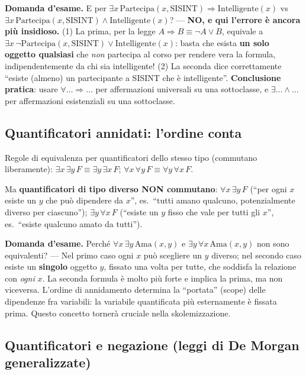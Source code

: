 \documentclass[11pt,a4paper]{report}
\newcommand{\domandaesame}[1]{\begin{esame}\textbf{Domanda d'esame.} #1\end{esame}}
\begin{document}
\domandaesame{E per $\exists x\, \text{Partecipa}(x,\text{SISINT}) \Rightarrow \text{Intelligente}(x)$ vs $\exists x\, \text{Partecipa}(x,\text{SISINT}) \wedge \text{Intelligente}(x)$? --- \textbf{NO, e qui l'errore è ancora più insidioso.} (1) La prima, per la legge $A\Rightarrow B \equiv \neg A\vee B$, equivale a $\exists x\, \neg\text{Partecipa}(x,\text{SISINT}) \vee \text{Intelligente}(x)$: basta che esista \textbf{un solo oggetto qualsiasi} che \emph{non} partecipa al corso per rendere vera la formula, indipendentemente da chi sia intelligente! (2) La seconda dice correttamente ``esiste (almeno) un partecipante a SISINT che è intelligente''. \textbf{Conclusione pratica}: usare $\forall \dots \Rightarrow \dots$ per affermazioni universali su una sottoclasse, e $\exists \dots \wedge \dots$ per affermazioni esistenziali su una sottoclasse.}

\subsection*{Quantificatori annidati: l'ordine conta}

Regole di equivalenza per quantificatori dello stesso tipo (commutano liberamente): $\exists x\,\exists y\, F \equiv \exists y\,\exists x\, F$; $\forall x\,\forall y\, F \equiv \forall y\,\forall x\, F$.

Ma \textbf{quantificatori di tipo diverso NON commutano}: $\forall x\,\exists y\, F$ (``per ogni $x$ esiste un $y$ che può dipendere da $x$'', es.\ ``tutti amano qualcuno, potenzialmente diverso per ciascuno''); $\exists y\,\forall x\, F$ (``esiste un $y$ fisso che vale per tutti gli $x$'', es.\ ``esiste qualcuno amato da tutti'').

\domandaesame{Perché $\forall x\,\exists y\, \text{Ama}(x,y)$ e $\exists y\,\forall x\, \text{Ama}(x,y)$ non sono equivalenti? --- Nel primo caso ogni $x$ può scegliere un $y$ diverso; nel secondo caso esiste un \textbf{singolo} oggetto $y$, fissato una volta per tutte, che soddisfa la relazione con \emph{ogni} $x$. La seconda formula è molto più forte e implica la prima, ma non viceversa. L'ordine di annidamento determina la ``portata'' (scope) delle dipendenze fra variabili: la variabile quantificata più esternamente è fissata prima. Questo concetto tornerà cruciale nella skolemizzazione.}

\subsection*{Quantificatori e negazione (leggi di De Morgan generalizzate)}
\end{document}
